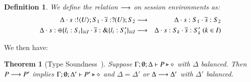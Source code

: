 \documentclass[preprint,11pt]{elsarticle}
\newtheorem{definition}{Definition}[section]
\newtheorem{theorem}{Theorem}[section]
\begin{document}
{\begin{definition}%
	\label{def:ses_red}
	We define the relation $\longrightarrow$ on session environments as:
	\begin{eqnarray*}
			\Delta \cat s: \btout{U} S_1 \cat \dual{s}: \btinp{U} S_2 & \red &
			\Delta \cat s: S_1 \cat \dual{s}: S_2\\%
			\Delta \cat s: \btsel{l_i: S_i}_{i \in I} \cat \dual{s}: \btbra{l_i: S_i'}_{i \in I} &\red& 
			 \Delta \cat s: S_k \cat \dual{s}: S_k' \ (k \in I)
		\end{eqnarray*}
\end{definition}




We then have:

\begin{theorem}[Type Soundness~\cite{KouzapasPY17}]\label{t:sr}\rm
%
			Suppose $\Gamma; \emptyset; \Delta \vdash P \triangleright \diamond$
			with
			$\Delta$ balanced. 
			Then $P \longrightarrow P'$ implies $\Gamma; \emptyset; \Delta'  \vdash P' \triangleright \diamond$
			and $\Delta = \Delta'$ or $\Delta \longrightarrow \Delta'$
			with $\Delta'$ balanced. 
\end{theorem}




}
\end{document}
